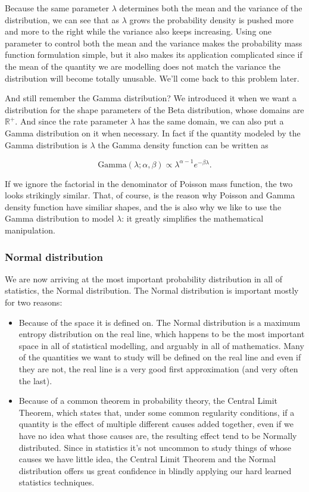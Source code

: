 \documentclass[11pt]{article}
\begin{document}
Because the same parameter \(\lambda\) determines both the mean and the variance of the distribution, we can see that as \(\lambda\) grows the probability density is pushed more and more to the right while the variance also keeps increasing. Using one parameter to control both the mean and the variance makes the probability mass function formulation simple, but it also makes its application complicated since if the mean of the quantity we are modelling does not match the variance the distribution will become totally unusable. We'll come back to this problem later.

And still remember the Gamma distribution? We introduced it when we want a distribution for the shape parameters of the Beta distribution, whose domains are \(\mathbb{R}^+\). And since the rate parameter \(\lambda\) has the same domain, we can also put a Gamma distribution on it when necessary. In fact if the quantity modeled by the Gamma distribution is \(\lambda\) the Gamma density function can be written as

$$\text{Gamma}(\lambda; \alpha, \beta) \propto \lambda^{\alpha-1} e^{-\beta \lambda}. $$

If we ignore the factorial in the denominator of Poisson mass function, the two looks strikingly similar. That, of course, is the reason why Poisson and Gamma density function have similiar shapes, and the is also why we like to use the Gamma distribution to model \(\lambda\): it greatly simplifies the mathematical manipulation.

\subsubsection{Normal distribution}
\label{sec:orgd080ebe}

We are now arriving at the most important probability distribution in all of statistics, the Normal distribution. The Normal distribution is important mostly for two reasons:

\begin{itemize}
\item Because of the space it is defined on. The Normal distribution is a maximum entropy distribution on the real line, which happens to be the most important space in all of statistical modelling, and arguably in all of mathematics. Many of the quantities we want to study will be defined on the real line and even if they are not, the real line is a very good first approximation (and very often the last).
\item Because of a common theorem in probability theory, the Central Limit Theorem, which states that, under some common regularity conditions, if a quantity is the effect of multiple different causes added together, even if we have no idea what those causes are, the resulting effect tend to be Normally distributed. Since in statistics it's not uncommon to study things of whose causes we have little idea, the Central Limit Theorem and the Normal distribution offers us great confidence in blindly applying our hard learned statistics techniques.
\end{itemize}
\end{document}
